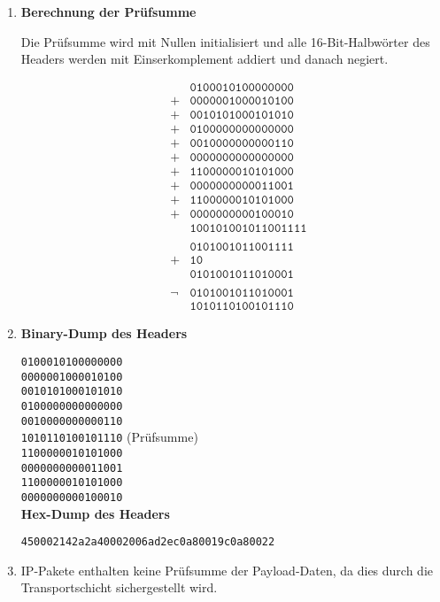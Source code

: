 \documentclass[ngerman]{scrartcl}
\begin{document}
	\begin{enumerate}[label=\alph*)]
    \item
    \textbf{Berechnung der Prüfsumme}

    Die Prüfsumme wird mit Nullen initialisiert und alle 16-Bit-Halbwörter des Headers werden mit Einserkomplement addiert und danach negiert.

    \begin{align*}
      &     &   \texttt{0100010100000000} \\
      &+    &   \texttt{0000001000010100} \\
      &+    &   \texttt{0010101000101010} \\
      &+    &   \texttt{0100000000000000} \\
      &+    &   \texttt{0010000000000110} \\
      &+    &   \texttt{0000000000000000} \\
      &+    &   \texttt{1100000010101000} \\
      &+    &   \texttt{0000000000011001} \\
      &+    &   \texttt{1100000010101000} \\
      &+    &   \texttt{0000000000100010} \\
      &     & \texttt{100101001011001111} \\
      \\ 
      &     &   \texttt{0101001011001111} \\
      &+    &                 \texttt{10} \\
      &     &   \texttt{0101001011010001} \\
      \\ 
      &\neg &   \texttt{0101001011010001} \\
      &     &   \texttt{1010110100101110}
    \end{align*}


    \item
    \textbf{Binary-Dump des Headers}

    \texttt{0100010100000000} \\ 
    \texttt{0000001000010100} \\ 
    \texttt{0010101000101010} \\ 
    \texttt{0100000000000000} \\ 
    \texttt{0010000000000110} \\ 
    \texttt{1010110100101110} (Prüfsumme) \\ 
    \texttt{1100000010101000} \\ 
    \texttt{0000000000011001} \\ 
    \texttt{1100000010101000} \\ 
    \texttt{0000000000100010} \\ 


    \textbf{Hex-Dump des Headers}

    \texttt{450002142a2a40002006ad2ec0a80019c0a80022}


    \item
    IP-Pakete enthalten keine Prüfsumme der Payload-Daten, da dies durch die Transportschicht sichergestellt wird.
	\end{enumerate}
\end{document}
